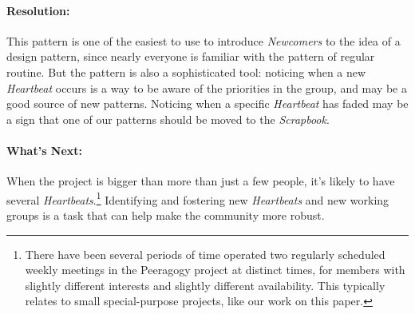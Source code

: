 \paragraph{Resolution:} This pattern is one of the easiest to use to introduce \emph{Newcomers} to the idea of a design pattern, since nearly everyone is familiar with the pattern of regular routine.  But the pattern is also a sophisticated tool: noticing when a new \emph{Heartbeat} occurs is a way to be aware of the priorities in the group, and may be a good source of new patterns.  Noticing when a specific \emph{Heartbeat} has faded may be a sign that one of our patterns should be moved to the \emph{Scrapbook}.

\paragraph{What's Next:} When the project is bigger than more than just a few people, it's likely to have several \emph{Heartbeats}.\footnote{There have been several periods of time operated two regularly scheduled weekly meetings in the Peeragogy project at distinct times, for members with slightly different interests and slightly different availability.  This typically relates to small special-purpose projects, like our work on this paper.}  Identifying and fostering new \emph{Heartbeats} and new working groups is a task that can help make the community more robust.
